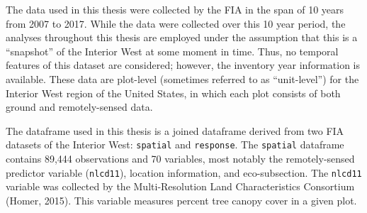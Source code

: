 \documentclass[12pt,twoside]{reedthesis}
\begin{document}
The data used in this thesis were collected by the FIA in the span of 10 years from 2007 to 2017. While the data were collected over this 10 year period, the analyses throughout this thesis are employed under the assumption that this is a ``snapshot'' of the Interior West at some moment in time. Thus, no temporal features of this dataset are considered; however, the inventory year information is available. These data are plot-level (sometimes referred to as ``unit-level'') for the Interior West region of the United States, in which each plot consists of both ground and remotely-sensed data.

The dataframe used in this thesis is a joined dataframe derived from two FIA datasets of the Interior West: \texttt{spatial} and \texttt{response}. The \texttt{spatial} dataframe contains 89,444 observations and 70 variables, most notably the remotely-sensed predictor variable (\texttt{nlcd11}), location information, and eco-subsection. The \texttt{nlcd11} variable was collected by the Multi-Resolution Land Characteristics Consortium (Homer, 2015). This variable measures percent tree canopy cover in a given plot.
\end{document}

